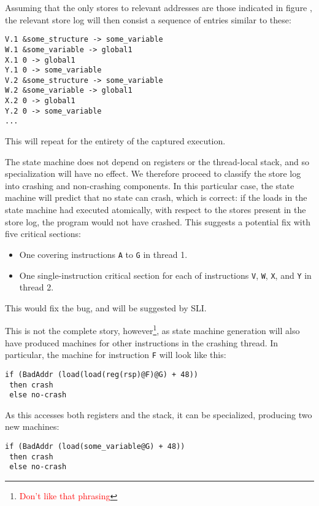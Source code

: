 \documentclass[10pt,twocolumn,preprint,natbib,authoryear]{sigplanconf}
\newcommand{\editorial}[1]{\textcolor{red}{\footnote{\textcolor{red}{#1}}}}
\begin{document}
Assuming that the only stores to relevant addresses are those
indicated in figure \label{fig:broken_privatize}, the relevant store
log will then consist a sequence of entries similar to these:

\begin{verbatim}
V.1 &some_structure -> some_variable
W.1 &some_variable -> global1
X.1 0 -> global1
Y.1 0 -> some_variable
V.2 &some_structure -> some_variable
W.2 &some_variable -> global1
X.2 0 -> global1
Y.2 0 -> some_variable
...
\end{verbatim}

This will repeat for the entirety of the captured execution.

The state machine does not depend on registers or the thread-local
stack, and so specialization will have no effect.  We therefore
proceed to classify the store log into crashing and non-crashing
components.  In this particular case, the state machine will predict
that no state can crash, which is correct: if the loads in the state
machine had executed atomically, with respect to the stores present in
the store log, the program would not have crashed.  This suggests a
potential fix with five critical sections:

\begin{itemize}
\item One covering instructions \verb|A| to \verb|G| in thread 1.
\item One single-instruction critical section for each of instructions
  \verb|V|, \verb|W|, \verb|X|, and \verb|Y| in thread 2.
\end{itemize}

This would fix the bug, and will be suggested by SLI.

This is not the complete story, however\editorial{Don't like that
  phrasing}, as state machine generation will also have produced
machines for other instructions in the crashing thread.  In particular,
the machine for instruction \verb|F| will look like this:

\begin{verbatim}
if (BadAddr (load(load(reg(rsp)@F)@G) + 48))
 then crash
 else no-crash
\end{verbatim}

As this accesses both registers and the stack, it can be specialized,
producing two new machines:

\begin{verbatim}
if (BadAddr (load(some_variable@G) + 48))
 then crash
 else no-crash
\end{verbatim}
\end{document}
